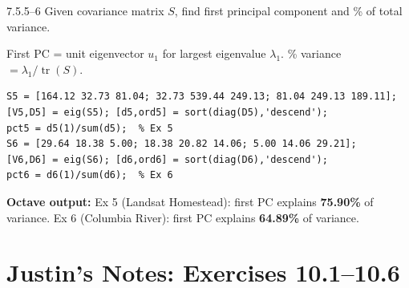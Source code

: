 \begin{exercise}{7.5.5--6}
Given covariance matrix $S$, find first principal component and \% of total variance.
\end{exercise}
\begin{solution}
First PC = unit eigenvector $u_1$ for largest eigenvalue $\lambda_1$. \% variance $=\lambda_1/\operatorname{tr}(S)$.
\begin{lstlisting}
S5 = [164.12 32.73 81.04; 32.73 539.44 249.13; 81.04 249.13 189.11];
[V5,D5] = eig(S5); [d5,ord5] = sort(diag(D5),'descend');
pct5 = d5(1)/sum(d5);  % Ex 5
S6 = [29.64 18.38 5.00; 18.38 20.82 14.06; 5.00 14.06 29.21];
[V6,D6] = eig(S6); [d6,ord6] = sort(diag(D6),'descend');
pct6 = d6(1)/sum(d6);  % Ex 6
\end{lstlisting}
\textbf{Octave output:} Ex 5 (Landsat Homestead): first PC explains \textbf{75.90\%} of variance. Ex 6 (Columbia River): first PC explains \textbf{64.89\%} of variance.
\end{solution}

\section*{Justin's Notes: Exercises 10.1--10.6}

